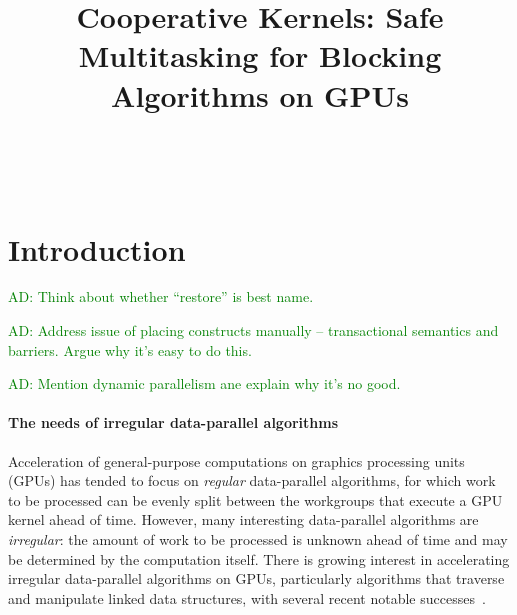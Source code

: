 \documentclass[nocopyrightspace]{sigplanconf-pldi16}
\newcommand{\ADComment}[1]{\textcolor{green}{AD: #1}}
\begin{document}
\title{Cooperative Kernels: Safe Multitasking for Blocking Algorithms on GPUs}

%
%

\authorinfo{}
{\makebox{} \\
}
{}




\maketitle

\begin{abstract}


\end{abstract}
    
\section{Introduction}\label{sec:intro}

\ADComment{Think about whether ``restore'' is best name.}


\ADComment{Address issue of placing constructs manually --
  transactional semantics and barriers.  Argue why it's easy to do this.}

\ADComment{Mention dynamic parallelism ane explain why it's no good.}

\paragraph{The needs of irregular data-parallel algorithms}
Acceleration of general-purpose computations on graphics processing
units (GPUs) has tended to focus on \emph{regular} data-parallel
algorithms, for which work to be processed can be evenly split between
the workgroups that execute a GPU kernel ahead of time.  However, many
interesting data-parallel algorithms are \emph{irregular}: the amount
of work to be processed is unknown ahead of time and may be determined
by the computation itself.  There is growing interest in accelerating irregular
data-parallel algorithms on GPUs, particularly algorithms that
traverse and manipulate linked data structures, with several recent notable
successes~\cite{...}.
\end{document}
